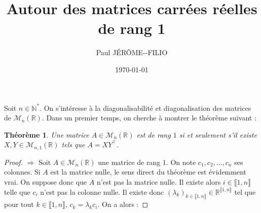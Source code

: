 \documentclass[a4paper]{article}
\title{Autour des matrices carrées réelles de rang 1}
\date{\today}
\author{Paul JÉRÔME-\--FILIO}
\newtheorem*{theorem}{Théorème}
\begin{document}
\maketitle

Soit $n \in \mathbb{N}^*$. On s'intéresse à la diagonalisabilité et diagonalisation des matrices de $\mathcal{M}_{n}(\mathbb{R})$. Dans un premier temps, on cherche à montrer le théorème suivant :

\begin{theorem}
    Une matrice $A \in \mathcal{M}_{n}(\mathbb{R})$ est de rang $1$ si et seulement s'il existe $X, Y \in \mathcal{M}_{n, 1}(\mathbb{R})$ tels que $A = XY^\top$.
\end{theorem}

\begin{proof}
    $\boxed{\Rightarrow}$ Soit $A \in \mathcal{M}_{n}(\mathbb{R})$ une matrice de rang $1$. On note $c_1, c_2, \dots, c_n$ ses colonnes. Si $A$ est la matrice nulle, le sens direct du théorème est évidemment vrai. On suppose donc que $A$ n'est pas la matrice nulle. Il existe alors $i \in \llbracket 1, n \rrbracket$ telle que $c_i$ n'est pas la colonne nulle. Il existe donc $\left(\lambda_k\right)_{k \in \llbracket 1, n \rrbracket} \in \mathbb{R}^{\llbracket 1, n \rrbracket}$ tel que pour tout $k \in \llbracket 1, n \rrbracket$, $c_k = \lambda_k c_i$. On a alors :
    

\end{proof}
\end{document}
